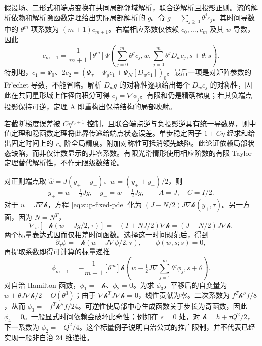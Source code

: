 假设场、二形式和端点变换在共同局部邻域解析，联合逆解析且投影正则。流的解析依赖和解析隐函数定理给出实际局部解析的 $g$。令 $g=\sum_{j\ge0}\theta^jc_j$。其时间导数中的 $\theta^m$ 项系数为 $(m+1)c_{m+1}$。右端相应系数仅依赖 $c_0,\ldots,c_m$ 及其 $w$ 导数，因此
\begin{equation}
 c_{m+1}=\frac1{m+1}[\theta^m]\Psi\left(
 \sum_{j=0}^m\theta^jc_j,w,\sum_{j=0}^m\theta^jD_wc_j,s+\theta;s\right).
 \label{eq:sup-coefficient-recursion}
\end{equation}
特别地，$c_1=\Psi_0$、$2c_2=(\Psi_\tau+\Psi_gc_1+\Psi_N[D_wc_1])_0$。最后一项是对矩阵参数的 Fr'echet 导数，不能省略。解析 $D_wg$ 的对称性逐项给出每个 $D_wc_j$ 的对称性，因此在共同星形域上作径向积分可得 $c_j=\nabla\phi_j$。有限和仍是精确梯度；若其负端点投影保持可逆，定理 A 即重构出保持结构的局部映射。

若截断梯度误差被 $C\eta^{r_o+1}$ 控制，且联合端点逆与负投影逆具有统一导数界，则中值定理和隐函数定理将此界传递给端点状态误差。单步稳定因子 $1+C\eta$ 经求和给出固定时间上的 $r_o$ 阶全局精度。附加对称性可抵消领先缺陷。此论证依赖局部状态缺陷，而非仅计数显示的非零系数。有限光滑情形使用相应阶数的有限 Taylor 定理替代解析性，不作无限级数结论。

对正则端点取 $\widehat w=J(y_+-y_-)$、$w=(y_++y_-)/2$，则
\begin{equation}
 y_+=w-\tfrac12Jg,\quad y_-=w+\tfrac12Jg,
 \qquad A=J,\quad C=I/2.
 \label{eq:sup-central-inverse}
\end{equation}
对于 $u=J\nabla\mathcal h$，方程 \eqref{eq:sup-fixed-pde} 化为 $(J-N/2)J\nabla\mathcal h(y_+,\tau)$。另一方面，因为 $N=N^T$，
\begin{equation}
 \nabla_w[-\mathcal h(w-Jg/2,\tau)]
 =-(I+NJ/2)\nabla\mathcal h
 =(J-N/2)J\nabla\mathcal h.
 \label{eq:sup-central-gradient}
\end{equation}
两个标量表达式因而仅相差时间函数。选择这一时间规范后，得到
\begin{equation}
 \partial_\tau\phi=-\mathcal h(w-J\nabla\phi/2,\tau),\qquad\phi(w,s;s)=0,
 \label{eq:sup-hamilton-jacobi}
\end{equation}
再提取系数即得可计算的标量递推
\begin{equation}
 \phi_{m+1}=-\frac1{m+1}[\theta^m]\mathcal h\left(
 w-\tfrac12J\nabla\sum_{j=1}^m\theta^j\phi_j,s+\theta\right).
 \label{eq:sup-scalar-recursion}
\end{equation}
对自治 Hamilton 函数，$\phi_1=-\mathcal h$、$\phi_2=0$。为求 $\phi_3$，平移后的自变量为 $w+\theta J\nabla\mathcal h/2+O(\theta^3)$；由于 $\nabla\mathcal h^TJ\nabla\mathcal h=0$，线性贡献为零。二次系数为 $f^T\mathcal h''f/8$，从而 $\phi_3=-f^T\mathcal h''f/24$。可逆性使局部中心生成函数关于步长为奇函数，因此 $\phi_4=0$。一般显式时间依赖会破坏此奇性；例如在 $s=0$ 处，对 $\mathcal h=h+\tau Q^2/2$，下一系数为 $\phi_2=-Q^2/4$。这个标量例子说明自治公式的推广限制，并不代表已经实现一般非自治 24 维递推。

